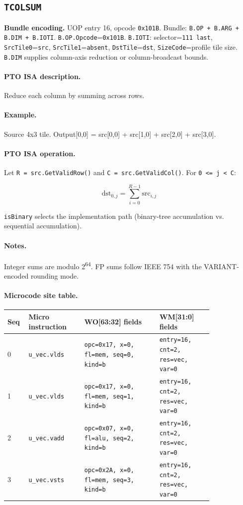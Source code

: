 \subsection{\texttt{TCOLSUM}}
\noindent\textbf{Bundle encoding.} UOP entry 16, opcode \texttt{0x101B}. Bundle: \texttt{B.OP + B.ARG + B.DIM + B.IOTI}. \texttt{B.OP.Opcode}=\texttt{0x101B}. \texttt{B.IOTI}: selector=\texttt{111 last}, \texttt{SrcTile0}=\texttt{src}, \texttt{SrcTile1}=\texttt{absent}, \texttt{DstTile}=\texttt{dst}, \texttt{SizeCode}=profile tile size. \texttt{B.DIM} supplies column-axis reduction or column-broadcast bounds.\par\smallskip
{\small
\paragraph{PTO ISA description.}
Reduce each column by summing across rows.
\paragraph{Example.}
Source 4x3 tile. Output[0,0] = src[0,0] + src[1,0] + src[2,0] + src[3,0].
\par\smallskip
\paragraph{PTO ISA operation.}
Let \texttt{R = src.GetValidRow()} and \texttt{C = src.GetValidCol()}. For \texttt{0 \textless{}= j \textless{} C}:

\[
\mathrm{dst}_{0,j} = \sum_{i=0}^{R-1} \mathrm{src}_{i,j}
\]

\texttt{isBinary} selects the implementation path (binary-tree accumulation vs. sequential accumulation).
}\par\smallskip
\paragraph{Notes.}
Integer sums are modulo 2\textsuperscript{64}. FP sums follow IEEE 754 with the VARIANT-encoded rounding mode.
\paragraph{Microcode site table.}
{\scriptsize
\begin{longtable}{@{}R{0.055\linewidth}L{0.23\linewidth}L{0.31\linewidth}L{0.22\linewidth}@{}}
\toprule
Seq & Micro instruction & WO[63:32] fields & WM[31:0] fields \\
 & \texttt{u\_vec.vlds} & \texttt{opc=0x17, x=0, fl=mem, seq=0, kind=b} & \texttt{entry=16, cnt=2, res=vec, var=0} \\
1 & \texttt{u\_vec.vlds} & \texttt{opc=0x17, x=0, fl=mem, seq=1, kind=b} & \texttt{entry=16, cnt=2, res=vec, var=0} \\
2 & \texttt{u\_vec.vadd} & \texttt{opc=0x07, x=0, fl=alu, seq=2, kind=b} & \texttt{entry=16, cnt=2, res=vec, var=0} \\
3 & \texttt{u\_vec.vsts} & \texttt{opc=0x2A, x=0, fl=mem, seq=3, kind=b} & \texttt{entry=16, cnt=2, res=vec, var=0} \\
\bottomrule
\end{longtable}
}
